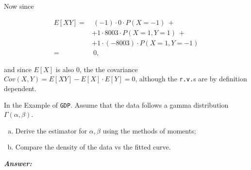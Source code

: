 \documentclass[12pt]{article}
\newenvironment{question}[2][Question]{\begin{trivlist}
\item[\hskip \labelsep {\bfseries #1}\hskip \labelsep {\bfseries #2.}]}{\end{trivlist}}
\begin{document}
Now since

\begin{align*}
E[XY] = & \  (-1) \cdot 0 \cdot P(X = - 1)  \ + \\
&+1 \cdot 8003 \cdot P(X = 1, Y = 1) \ + \\
& +1 \cdot (-8003) \cdot P(X = 1, Y = -1)  \\
=& \ 0,
\end{align*}

and since $E[X]$ is also $0$, the
the covariance $Cov(X, Y) = E[XY] - E[X] \cdot E[Y] = 0$, although the \texttt{r.v.}s are by definition dependent.

\bigskip
\bigskip

\begin{question}{3.3}

In the Example of \texttt{GDP}. Assume that the data follows a gamma distribution $\Gamma(\alpha, \beta)$.

\begin{enumerate}[(a)]
\item Derive the estimator for $\alpha, \beta$ using the methods of moments;
\item Compare the density of the data vs the fitted curve.
\end{enumerate}

\end{question}

 \textbf{\color{TealBlue}\emph{Answer:} } 
\end{document}
